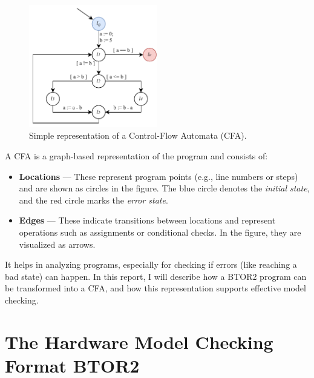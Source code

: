\begin{figure}
  \centering
  \includegraphics[width=0.5\textwidth]{figures/cfa_simple.drawio.pdf}
  \caption{Simple representation of a Control-Flow Automata (CFA).}
  \label{fig:cfa}
\end{figure}

A CFA is a graph-based  representation of the program and consists of:
\begin{itemize}
  \item \textbf{Locations} — These represent program points (e.g., line numbers or steps) and are shown as circles in the figure. The blue circle denotes the \textit{initial state}, and the red circle marks the \textit{error state}.
  \item \textbf{Edges} — These indicate transitions between locations and represent operations such as assignments or conditional checks. In the figure, they are visualized as arrows.
\end{itemize}

It helps in analyzing programs, especially for checking if errors (like reaching a bad state) can happen. In this report, I will describe how a BTOR2 program can be transformed into a CFA, and how this representation supports effective model checking.

\section{The Hardware Model Checking Format BTOR2}

